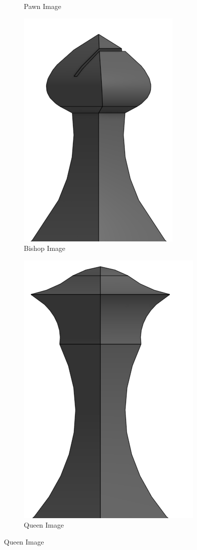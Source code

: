 \documentclass{IEEEtran}
\begin{document}
\begin{figure}
\begin{subfigure}{.3\textwidth}
                    \caption{Pawn Image}
                \end{subfigure}
                \begin{subfigure}{.3\textwidth}
                    \includegraphics{../cut_images/bishop.png}
                    \caption{Bishop Image}
                \end{subfigure}
                \begin{subfigure}{.3\textwidth}
                    \includegraphics{../cut_images/queen.png}
                    \caption{Queen Image}
                \end{subfigure}
            \end{figure}
        
\end{document}
